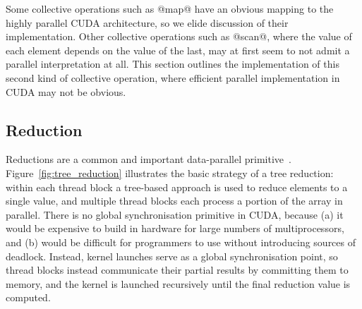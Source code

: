 
Some collective operations such as @map@ have an obvious mapping to the
highly parallel CUDA architecture, so we elide discussion of their
implementation. Other collective operations such as @scan@, where the value
of each element depends on the value of the last, may at first seem to not admit
a parallel interpretation at all. This section outlines the implementation of
this second kind of collective operation, where efficient parallel
implementation in CUDA may not be obvious.


\subsection{Reduction}
\label{sec:parallel_reduction}

Reductions are a common and important data-parallel primitive~\cite{Chatterjee:2009vh}.
Figure~\ref{fig:tree_reduction} illustrates the basic strategy of a tree
reduction: within each thread block a tree-based approach is used to reduce
elements to a single value, and multiple thread blocks each process a portion of
the array in parallel. There is no global synchronisation primitive in CUDA,
because (a) it would be expensive to build in hardware for large numbers of
multiprocessors, and (b) would be difficult for programmers to use without
introducing sources of deadlock. Instead, kernel launches serve as a global
synchronisation point, so thread blocks instead communicate their partial
results by committing them to memory, and the kernel is launched recursively
until the final reduction value is computed.

